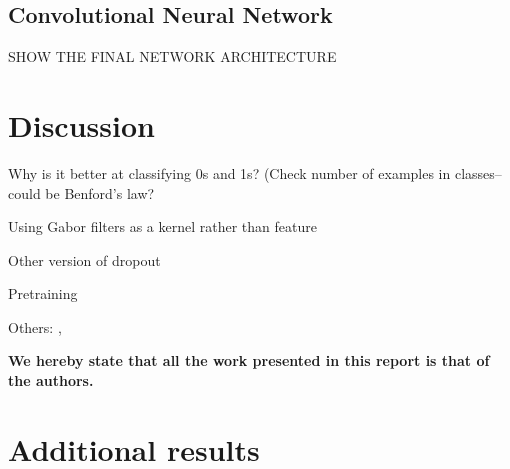 \documentclass{acm_proc_article-sp}
\begin{document}
\subsection{Convolutional Neural Network}


SHOW THE FINAL NETWORK ARCHITECTURE

\section{Discussion}%
Why is it better at classifying 0s and 1s? (Check number of examples in classes--could be Benford's law?

Using Gabor filters as a kernel rather than feature \cite{Sabri}

Other version of dropout \cite{Wan}

Pretraining \cite{Erhan}

Others: \cite{Rowley}, \cite{Simard}

{\bfseries We hereby state that all the work presented in this report is that of the authors.}




\appendix
\label{appendix}

\section{Additional results}
\label{sec:additional-results}
\end{document}
